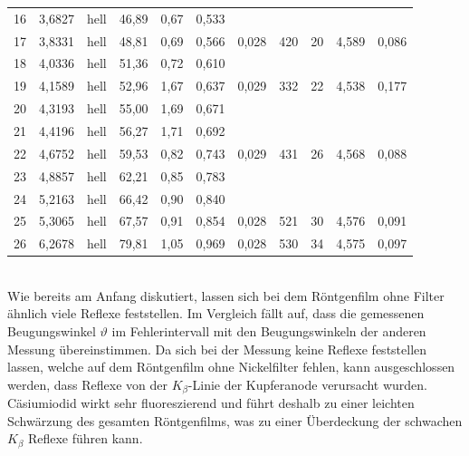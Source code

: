 \documentclass[a4paper,twoside,final]{article}
\begin{document}
\begin{table}[ht]
\begin{tabular}{l c c c c c | c c c c c }
    16 & 3,6827 & hell         & 46,89 & 0,67 & 0,533 &       &     &    &       &       \\
    17 & 3,8331 & hell         & 48,81 & 0,69 & 0,566 & 0,028 & 420 & 20 & 4,589 & 0,086 \\
    18 & 4,0336 & hell         & 51,36 & 0,72 & 0,610 &       &     &    &       &       \\
    19 & 4,1589 & hell         & 52,96 & 1,67 & 0,637 & 0,029 & 332 & 22 & 4,538 & 0,177 \\
    20 & 4,3193 & hell         & 55,00 & 1,69 & 0,671 &       &     &    &       &       \\
    21 & 4,4196 & hell         & 56,27 & 1,71 & 0,692 &       &     &    &       &       \\
    22 & 4,6752 & hell         & 59,53 & 0,82 & 0,743 & 0,029 & 431 & 26 & 4,568 & 0,088 \\
    23 & 4,8857 & hell         & 62,21 & 0,85 & 0,783 &       &     &    &       &       \\
    24 & 5,2163 & hell         & 66,42 & 0,90 & 0,840 &       &     &    &       &       \\
    25 & 5,3065 & hell         & 67,57 & 0,91 & 0,854 & 0,028 & 521 & 30 & 4,576 & 0,091 \\
    26 & 6,2678 & hell         & 79,81 & 1,05 & 0,969 & 0,028 & 530 & 34 & 4,575 & 0,097
	\end{tabular}
\end{table}\\
Wie bereits am Anfang diskutiert, lassen sich bei dem Röntgenfilm ohne Filter ähnlich viele Reflexe feststellen. Im Vergleich fällt auf, dass die gemessenen Beugungswinkel $\vartheta$ im Fehlerintervall mit den Beugungswinkeln der anderen Messung übereinstimmen. Da sich bei der Messung keine Reflexe feststellen lassen, welche auf dem Röntgenfilm ohne Nickelfilter fehlen, kann ausgeschlossen werden, dass Reflexe von der $K_\beta$-Linie der Kupferanode verursacht wurden.\\
Cäsiumiodid wirkt sehr fluoreszierend und führt deshalb zu einer leichten Schwärzung des gesamten Röntgenfilms, was zu einer Überdeckung der schwachen $K_\beta$ Reflexe führen kann.
\FloatBarrier
\end{document}
